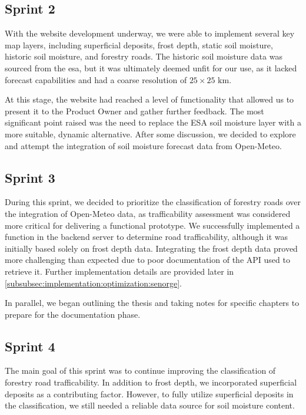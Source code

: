 \subsection*{Sprint 2}

With the website development underway, we were able to implement several key map layers, including superficial deposits, frost depth, static soil moisture, historic soil moisture, and forestry roads. The historic soil moisture data was sourced from the \acrshort{esa}, but it was ultimately deemed unfit for our use, as it lacked forecast capabilities and had a coarse resolution of $25 \times 25\text{ km}$.

At this stage, the website had reached a level of functionality that allowed us to present it to the Product Owner and gather further feedback. The most significant point raised was the need to replace the ESA soil moisture layer with a more suitable, dynamic alternative. After some discussion, we decided to explore and attempt the integration of soil moisture forecast data from Open-Meteo.

\subsection*{Sprint 3}

During this sprint, we decided to prioritize the classification of forestry roads over the integration of Open-Meteo data, as trafficability assessment was considered more critical for delivering a functional prototype. We successfully implemented a function in the backend server to determine road trafficability, although it was initially based solely on frost depth data. Integrating the frost depth data proved more challenging than expected due to poor documentation of the API used to retrieve it. Further implementation details are provided later in \autoref{subsubsec:implementation:optimization:senorge}.

In parallel, we began outlining the thesis and taking notes for specific chapters to prepare for the documentation phase.

\subsection*{Sprint 4}

The main goal of this sprint was to continue improving the classification of forestry road trafficability. In addition to frost depth, we incorporated superficial deposits as a contributing factor. However, to fully utilize superficial deposits in the classification, we still needed a reliable data source for soil moisture content.

